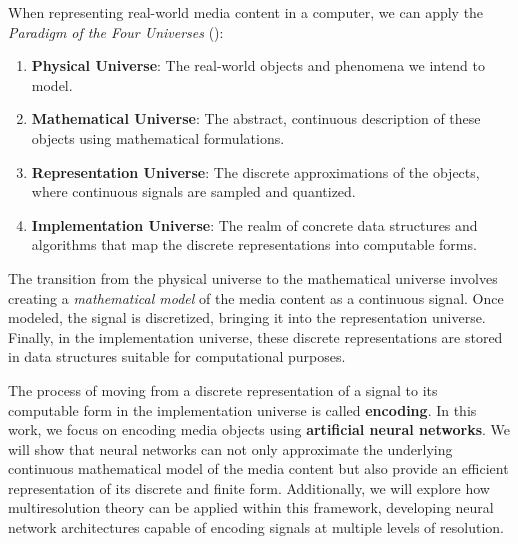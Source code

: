 When representing real-world media content in a computer, we can apply the \textit{Paradigm of the Four Universes} (\cite{gomes1995}):

\begin{enumerate}
\item \textbf{Physical Universe}: The real-world objects and phenomena we intend to model.
\item \textbf{Mathematical Universe}: The abstract, continuous description of these objects using mathematical formulations.
\item \textbf{Representation Universe}: The discrete approximations of the objects, where continuous signals are sampled and quantized.
\item \textbf{Implementation Universe}: The realm of concrete data structures and algorithms that map the discrete representations into computable forms.
\end{enumerate}

The transition from the physical universe to the mathematical universe involves creating a \textit{mathematical model} of the media content as a continuous signal. Once modeled, the signal is discretized, bringing it into the representation universe. Finally, in the implementation universe, these discrete representations are stored in data structures suitable for computational purposes.

The process of moving from a discrete representation of a signal to its computable form in the implementation universe is called \textbf{encoding}. In this work, we focus on encoding media objects using \textbf{artificial neural networks}. We will show that neural networks can not only approximate the underlying continuous mathematical model of the media content but also provide an efficient representation of its discrete and finite form. Additionally, we will explore how multiresolution theory can be applied within this framework, developing neural network architectures capable of encoding signals at multiple levels of resolution.




